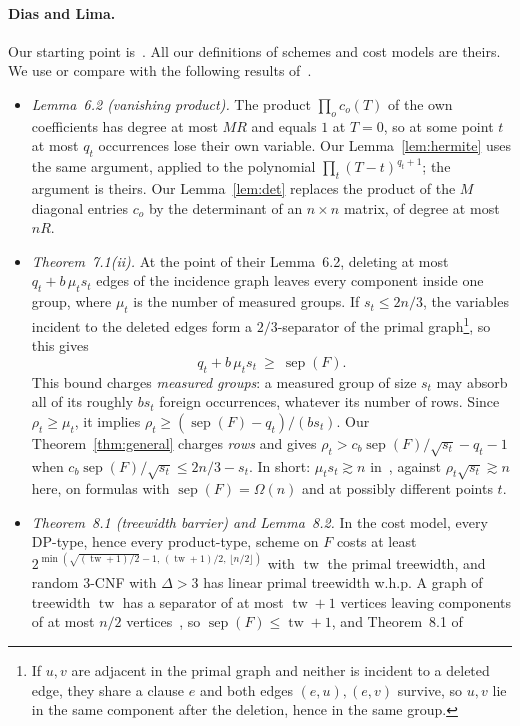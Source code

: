 \documentclass[11pt,a4paper]{article}
\theoremstyle{definition}
\theoremstyle{remark}
\newcommand{\sep}{\operatorname{sep}}
\newcommand{\tw}{\operatorname{tw}}
\begin{document}
\paragraph{Dias and Lima.} Our starting point is~\cite{DL}. All our definitions of schemes
and cost models are theirs. We use or compare with the following results of~\cite{DL}.
\begin{itemize}
\item \emph{Lemma~6.2 (vanishing product).} The product $\prod_o c_o(T)$ of the own
 coefficients has degree at most $MR$ and equals $1$ at $T=0$, so at some point $t$ at most
 $q_t$ occurrences lose their own variable. Our Lemma~\ref{lem:hermite} uses the same
 argument, applied to the polynomial $\prod_{t}(T-t)^{q_t+1}$; the argument is theirs. Our
 Lemma~\ref{lem:det} replaces the product of the $M$ diagonal entries $c_o$ by the
 determinant of an $n\times n$ matrix, of degree at most $nR$.
\item \emph{Theorem~7.1(ii).} At the point of their Lemma~6.2, deleting at most
 $q_t+b\,\mu_ts_t$ edges of the incidence graph leaves every component inside one group,
 where $\mu_t$ is the number of measured groups. If $s_t\le 2n/3$, the variables incident to
 the deleted edges form a $2/3$-separator of the primal graph\footnote{If $u,v$ are adjacent
 in the primal graph and neither is incident to a deleted edge, they share a clause $e$ and
 both edges $(e,u),(e,v)$ survive, so $u,v$ lie in the same component after the deletion,
 hence in the same group.}, so this gives
 \[
 q_t+b\,\mu_t s_t\ \ge\ \sep(F).
 \]
 This bound charges \emph{measured groups}: a measured group of size $s_t$ may absorb all of
 its roughly $bs_t$ foreign occurrences, whatever its number of rows. Since
 $\rho_t\ge\mu_t$, it implies $\rho_t\ge(\sep(F)-q_t)/(bs_t)$. Our
 Theorem~\ref{thm:general} charges \emph{rows} and gives
 $\rho_t>c_b\sep(F)/\sqrt{s_t}-q_t-1$ when $c_b\sep(F)/\sqrt{s_t}\le 2n/3-s_t$. In short:
 $\mu_ts_t\gtrsim n$ in~\cite{DL}, against $\rho_t\sqrt{s_t}\gtrsim n$ here, on formulas with
 $\sep(F)=\Omega(n)$ and at possibly different points $t$.
\item \emph{Theorem~8.1 (treewidth barrier) and Lemma~8.2.} In the cost model, every DP-type,
 hence every product-type, scheme on $F$ costs at least
 $2^{\min(\sqrt{(\tw+1)/2}-1,\,(\tw+1)/2,\,\lfloor n/2\rfloor)}$ with $\tw$ the primal
 treewidth, and random 3-CNF with $\Delta>3$ has linear primal treewidth w.h.p. A graph of
 treewidth $\tw$ has a separator of at most $\tw+1$ vertices leaving components of at most
 $n/2$ vertices~\cite{RS86,Bod93}, so $\sep(F)\le\tw+1$, and Theorem~8.1 of~\cite{DL}

\end{itemize}
\end{document}
